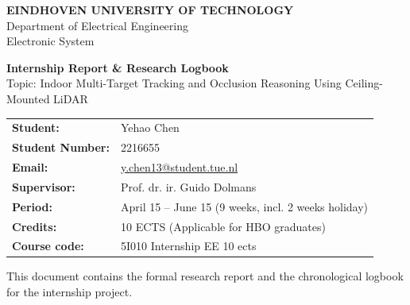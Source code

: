 \documentclass[11pt,a4paper]{report}
\begin{document}
\begin{titlepage}
    \begin{flushleft}
        {\LARGE \textbf{EINDHOVEN UNIVERSITY OF TECHNOLOGY}} \\
        \vspace{0.2cm}
        {\large Department of Electrical Engineering} \\
        {\small Electronic System}
    \end{flushleft}

    \vspace{3.5cm}

    \begin{flushleft}
        {\huge \textbf{Internship Report \& Research Logbook}} \\
        \vspace{0.5cm}
        {\Large Topic: Indoor Multi-Target Tracking and Occlusion Reasoning Using Ceiling-Mounted LiDAR}
    \end{flushleft}

    \vspace{3.5cm}

    \begin{flushleft}
        \begin{tabular}{ll}
            \textbf{Student:} & Yehao Chen \\
            \textbf{Student Number:} & 2216655 \\
            \textbf{Email:} & \href{mailto:y.chen13@student.tue.nl}{y.chen13@student.tue.nl} \\
            \textbf{Supervisor:} & Prof. dr. ir. Guido Dolmans \\
            \textbf{Period:} & April 15 -- June 15 (9 weeks, incl. 2 weeks holiday) \\
            \textbf{Credits:} & 10 ECTS (Applicable for HBO graduates)\\
            \textbf{Course code:} & 5I010 Internship EE 10 ects
        \end{tabular}
    \end{flushleft}

    \vfill
    \begin{center}
        {\small This document contains the formal research report and the chronological logbook for the internship project.}
    \end{center}
\end{titlepage}
\end{document}
